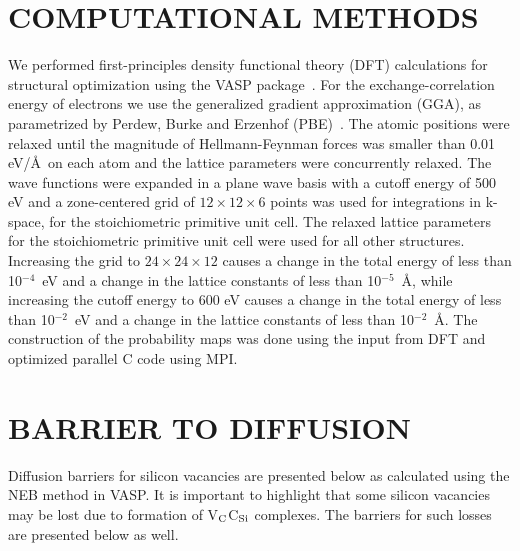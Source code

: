 \documentclass[aps,prb,preprint,superscriptaddress]{revtex4-1}
\begin{document}
\section{\label{methods}COMPUTATIONAL METHODS}

We performed first-principles density functional theory (DFT) calculations for structural optimization using the VASP package~\cite{Kresse1,Kresse2,Kresse3}. For the exchange-correlation energy of electrons we use the generalized gradient approximation (GGA), as parametrized by Perdew, Burke and Erzenhof (PBE)~\cite{Perdew}. The atomic positions were relaxed until the magnitude of 
Hellmann-Feynman forces was
smaller than 0.01 eV/\AA~on each atom and the lattice parameters were concurrently relaxed. The wave functions were expanded in a plane wave basis with a cutoff energy of 500 eV and a zone-centered grid of $12\times12\times6$ points was used for integrations in k-space, for the stoichiometric primitive unit cell. The relaxed lattice parameters for the stoichiometric primitive unit cell were used for all other structures. Increasing the grid to $24\times24\times12$ causes a change in the total energy of less than 10$^{-4}$~eV and a change in the lattice constants of less than 10$^{-5}$~\AA, while increasing the cutoff energy to 600 eV causes a change in the total energy of less than 10$^{-2}$~eV and a change in the lattice constants of less than 10$^{-2}$~\AA. The construction of the probability maps was done using the input from DFT and optimized parallel C code using MPI.

\section{\label{barriers}BARRIER TO DIFFUSION}
Diffusion barriers for silicon vacancies are presented below as calculated using the NEB method in VASP. It is important to highlight that some silicon vacancies may be lost due to formation of V$_{\rm C}$C$_{\rm Si}$ complexes. The barriers for such losses are presented below as well.
\end{document}
